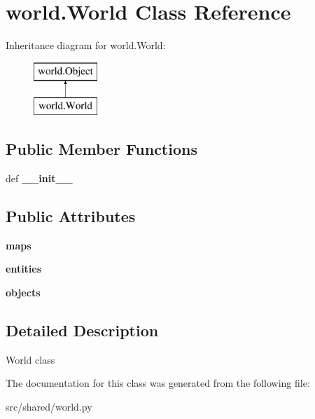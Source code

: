 \hypertarget{classworld_1_1_world}{\section{world.\-World \-Class \-Reference}
\label{classworld_1_1_world}
}
\-Inheritance diagram for world.\-World\-:\begin{figure}[H]
\begin{center}
\leavevmode
\includegraphics[height=2.000000cm]{classworld_1_1_world}
\end{center}
\end{figure}
\subsection*{\-Public \-Member \-Functions}
\begin{DoxyCompactItemize}
\item 
\hypertarget{classworld_1_1_world_a4351253668240be9d3a0d5bc2f1aa18f}{def {\bfseries \-\_\-\-\_\-init\-\_\-\-\_\-}}\label{classworld_1_1_world_a4351253668240be9d3a0d5bc2f1aa18f}

\end{DoxyCompactItemize}
\subsection*{\-Public \-Attributes}
\begin{DoxyCompactItemize}
\item 
\hypertarget{classworld_1_1_world_ae5d81046b959889536deca60b2df94a4}{{\bfseries maps}}\label{classworld_1_1_world_ae5d81046b959889536deca60b2df94a4}

\item 
\hypertarget{classworld_1_1_world_ae2c39feccf4fcd06f11f8398e42505a4}{{\bfseries entities}}\label{classworld_1_1_world_ae2c39feccf4fcd06f11f8398e42505a4}

\item 
\hypertarget{classworld_1_1_world_a144e6d2a815857b12be4cd2bf4ac2c44}{{\bfseries objects}}\label{classworld_1_1_world_a144e6d2a815857b12be4cd2bf4ac2c44}

\end{DoxyCompactItemize}


\subsection{\-Detailed \-Description}
\begin{DoxyVerb}World class \end{DoxyVerb}
 

\-The documentation for this class was generated from the following file\-:\begin{DoxyCompactItemize}
\item 
src/shared/world.\-py\end{DoxyCompactItemize}
